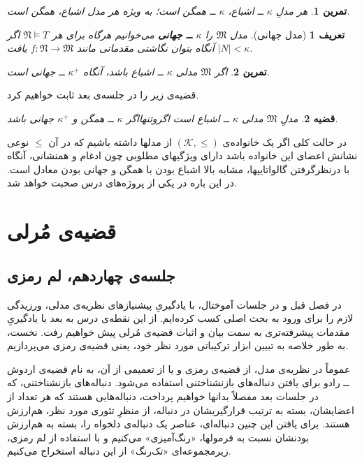 \documentclass[12pt,a4paper]{report}
\theoremstyle{colorhead}
\newtheorem{thm}{قضیه}
\newtheorem{tam}{تمرین}
\newtheorem{defn}[thm]{تعریف}
\begin{document}
\begin{tam}
هر مدلِ
$\kappa$
ــ
اشباع،
$\kappa$
ــ
همگن است؛ به ویژه هر مدل اشباع، همگن است.
\end{tam}
\begin{defn}[مدل جهانی]
مدل
$\mathfrak{M}$
را
\textbf{$\kappa$
ــ
جهانی }
می‌خوانیم هرگاه برای هر
$\mathfrak{N}\models T$
اگر
$|N|<\kappa$
آنگاه بتوان نگاشتی مقدماتی مانند
$f:\mathfrak{N}\to \mathfrak{M}$
یافت.
\end{defn}
\begin{tam}
اگر
$\mathfrak{M}$
مدلی
$\kappa$ ــ
اشباع باشد، آنگاه 
$\kappa^+$
ــ 
جهانی است.
\end{tam}
قضیه‌ی زیر را در جلسه‌ی بعد ثابت خواهیم کرد.
\begin{thm}
مدلِ
$\mathfrak{M}$
مدلی
$\kappa$ ــ
اشباع است اگروتنهااگر
$\kappa$
ــ
همگن و 
$\kappa^+$
جهانی باشد.
\end{thm}
در حالت کلی اگر یک
خانواده‌ی
$(\mathcal{K},\leq)$
از مدلها
داشته باشیم که در آن
$\leq$
نوعی نشانش اعضای این خانواده باشد دارای ویژگیهای مطلوبی چون ادغام و  همنشانی،
آنگاه با درنظرگرفتن
گالواتایپها،   مشابه بالا 
اشباع بودن با همگن و جهانی بودن معادل است. در این باره در یکی از پروژه‌های درس صحبت خواهد شد. 
\chapter{قضیه‌ی مُرلی}
\section{جلسه‌ی چهاردهم،‌ لم رمزی}
در فصل قبل 
و در جلسات آموختال،
با یادگیریِ پیشنیازهای نظریه‌ی مدلی، ورزیدگی لازم  را برای 
 ورود به بحث اصلی کسب کرده‌ایم. 
از این نقطه‌ی درس به بعد با یادگیریِ 
مقدمات پیشرفته‌تری به سمت بیان و
اثبات قضیه‌ی مُرلی پیش خواهیم رفت.  نخست، به طور خلاصه به تبیین  ابزار ترکیباتی مورد نظر خود، یعنی قضیه‌ی رمزی می‌پردازیم.
\par 
عموماً در نظریه‌ی مدل، از قضیه‌ی رمزی
 و یا از تعمیمی از آن، به نام قضیه‌ی اردوش ــ‌ رادو
 برای یافتن دنباله‌های بازنشناختنی استفاده می‌شود. دنباله‌های بازنشناختنی، که در جلسات بعد مفصلاً  بدانها خواهیم پرداخت، دنباله‌هایی هستند که هر تعداد از اعضایشان، بسته به ترتیب 
 قرارگیریشان در دنباله،
از منظرِ تئوری مورد نظر، هم‌ارزش هستند. برای  یافتن این چنین دنباله‌ای، 
 عناصر یک دنباله‌ی دلخواه را،‌ بسته‌ به هم‌ارزش بودنشان نسبت به فرمولها، «رنگ‌آمیزی» می‌کنیم و با استفاده از لم‌ رمزی، زیرمجموعه‌ای «تک‌رنگ» از این دنباله استخراج می‌کنیم. 
\end{document}
